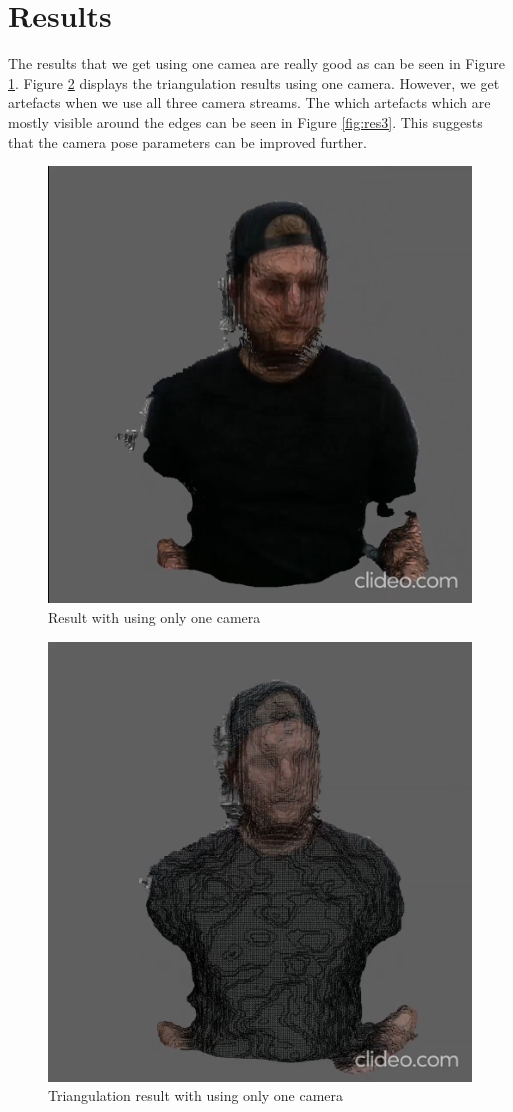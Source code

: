 \documentclass[10pt,twocolumn,letterpaper]{article}
\begin{document}
\section{Results}
The results that we get using one camea are really good as can be seen in Figure \ref{fig:res1}. Figure \ref{fig:res2} displays the triangulation results using one camera. However, we get artefacts when we use all three camera streams. The which artefacts which are mostly visible around the edges can be seen in Figure \ref{fig:res3}. This suggests that the camera pose parameters can be improved further.

\begin{figure}[t]
\begin{center}
\includegraphics[width=0.65\linewidth]{imgs/res1}
\end{center}
 \caption{Result with using only one camera}
 \label{fig:res1}
\end{figure}

\begin{figure}[t]
\begin{center}
\includegraphics[width=0.65\linewidth]{imgs/res2}
\end{center}
 \caption{Triangulation result with using only one camera}
 \label{fig:res2}
\end{figure}
\end{document}
